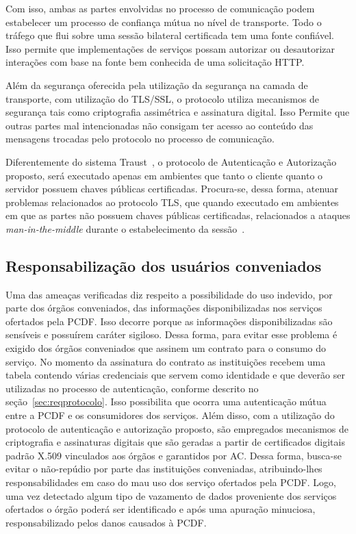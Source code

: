 Com isso, ambas as partes envolvidas no processo de comunicação podem estabelecer um processo de confiança mútua no nível de transporte. Todo o tráfego que flui sobre uma sessão bilateral certificada tem uma fonte confiável. Isso permite que implementações de serviços possam autorizar ou desautorizar interações com base na fonte bem conhecida de uma solicitação HTTP.

Além da segurança oferecida pela utilização da segurança na camada de transporte, com utilização do TLS/SSL, o protocolo utiliza mecanismos de segurança tais como
criptografia assimétrica e assinatura digital. Isso Permite que outras partes mal intencionadas não consigam ter acesso ao conteúdo das mensagens trocadas pelo protocolo
no processo de comunicação.

Diferentemente do sistema Traust~\cite{traust08}, o protocolo de Autenticação e Autorização proposto, será executado apenas em ambientes que tanto o cliente quanto o servidor possuem chaves públicas certificadas. Procura-se, dessa forma, atenuar problemas relacionados ao protocolo TLS, que quando executado em ambientes em que as partes
n\~{a}o possuem chaves públicas certificadas, relacionados a ataques \emph{man-in-the-middle} durante o estabelecimento da sessão~\cite{traust08}.

\subsection{Responsabilização dos usuários conveniados}

Uma das ameaças verificadas diz respeito a possibilidade do uso indevido, por parte dos órgãos conveniados, das informações disponibilizadas nos serviços ofertados pela PCDF. Isso decorre porque as informações disponibilizadas s\~{a}o sensíveis e possuírem caráter sigiloso. Dessa forma, para evitar esse problema é exigido dos órgãos conveniados que assinem um contrato para o consumo do serviço. No momento da assinatura do contrato as institui\c c\~{o}es recebem uma tabela contendo várias credenciais que servem como identidade e que deverão ser utilizadas no processo de autenticação, conforme descrito no seção~\ref{sec:reqprotocolo}. Isso possibilita que ocorra uma autenticação mútua entre a PCDF e os consumidores dos serviços. Além disso, com a utilização do protocolo de autenticação e autorização proposto, são empregados mecanismos de criptografia e assinaturas digitais que são geradas a partir de certificados digitais padrão X.509 vinculados aos órgãos e garantidos por AC. Dessa forma, busca-se evitar o não-repúdio por parte das institui\c c\~{o}es conveniadas,
atribuindo-lhes responsabilidades em caso do mau uso dos serviço ofertados pela PCDF. Logo, uma vez detectado algum tipo de vazamento de dados proveniente dos serviços ofertados o órgão poderá ser identificado e após uma apuração minuciosa, responsabilizado pelos danos causados à PCDF.

